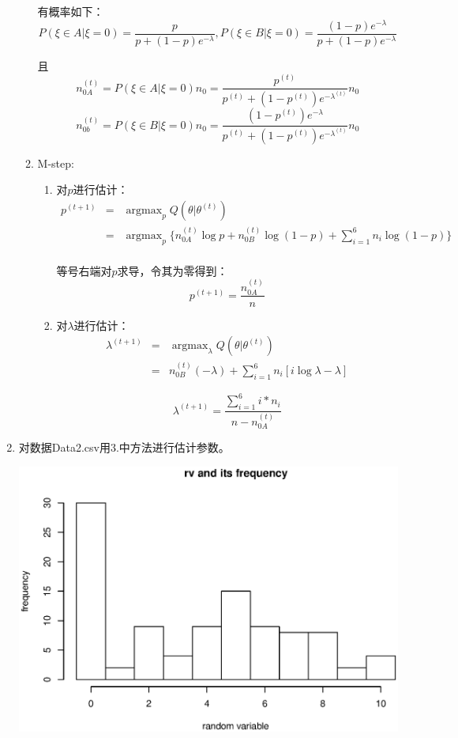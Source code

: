 \documentclass{ctexart}
\begin{document}
\begin{enumerate}
\begin{enumerate}
有概率如下：
\[P(\xi \in A| \xi=0)=\frac{p}{p+(1-p)e^{-\lambda}},
P(\xi \in B| \xi=0)=\frac{(1-p)e^{-\lambda}}{p+(1-p)e^{-\lambda}}\]

且 
\[n_{0A}^{(t)}=P(\xi \in A| \xi=0)n_0=\frac{p^{(t)}}{p^{(t)}+(1-p^{(t)})e^{-\lambda^{(t)}}}n_0\]
\[n_{0b}^{(t)}=P(\xi \in B| \xi=0)n_0=\frac{(1-p^{(t)})e^{-\lambda}}{p^{(t)}+(1-p^{(t)})e^{-\lambda^{(t)}}}n_0\]

\item M-step:

\begin{enumerate}
\item 对\(p\)进行估计：
\begin{eqnarray*}
p^{(t+1)}&=&\mathop{\text{arg} \max}_{p} Q(\theta|\theta^{(t)})\\
&=& \mathop{\text{arg} \max}_{p}  \{n_{0A}^{(t)} \log p +n_{0B}^{(t)}  \log(1-p) + \sum_{i=1}^6 n_i \log (1-p) \}\\
\end{eqnarray*}

等号右端对\(p\)求导，令其为零得到：
\[
p^{(t+1)}=\frac{n_{0A}^{(t)}}{n}\]

\item 对\(\lambda\)进行估计：
\begin{eqnarray*}
\lambda^{(t+1)}&=&\mathop{\text{arg} \max}_{\lambda}Q(\theta|\theta^{(t)})\\
&=&n_{0B}^{(t)} (-\lambda)+\sum_{i=1}^6 n_i[i\log \lambda-\lambda] 
\end{eqnarray*}



\[
\lambda^{(t+1)}= \frac{\displaystyle \sum_{i=1}^6 i*n_i}{n-n_{0A}^{(t)}}\]

\end{enumerate}
 
\end{enumerate}

\item
对数据Data2.csv用3.中方法进行估计参数。

\centerline{\includegraphics[width=5.5in]{4.eps}}


\end{enumerate}
\end{document}
